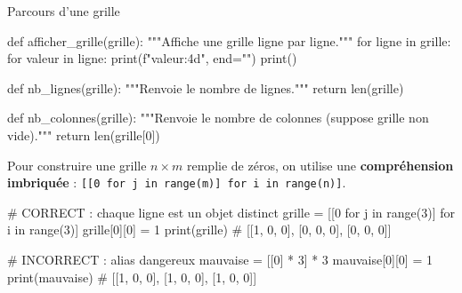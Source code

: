 \begin{codereference}{Parcours d'une grille}
\begin{python}
def afficher_grille(grille):
    """Affiche une grille ligne par ligne."""
    for ligne in grille:
        for valeur in ligne:
            print(f"{valeur:4d}", end="")
        print()

def nb_lignes(grille):
    """Renvoie le nombre de lignes."""
    return len(grille)

def nb_colonnes(grille):
    """Renvoie le nombre de colonnes (suppose grille non vide)."""
    return len(grille[0])
\end{python}
\end{codereference}



\begin{nxdef}[D8]
  Pour construire une grille $n \times m$ remplie de zéros, on utilise une
  \textbf{compréhension imbriquée} :
  \lstinline{[[0 for j in range(m)] for i in range(n)]}.
\end{nxdef}


\begin{python}
# CORRECT : chaque ligne est un objet distinct
grille = [[0 for j in range(3)] for i in range(3)]
grille[0][0] = 1
print(grille)  # [[1, 0, 0], [0, 0, 0], [0, 0, 0]]

# INCORRECT : alias dangereux
mauvaise = [[0] * 3] * 3
mauvaise[0][0] = 1
print(mauvaise)  # [[1, 0, 0], [1, 0, 0], [1, 0, 0]]
\end{python}


